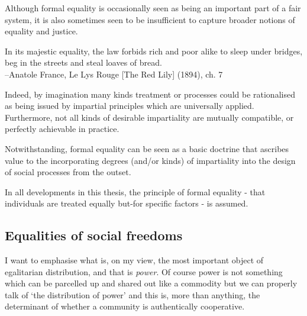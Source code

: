 Although formal equality is occasionally seen as being an important part of a fair system, it is also sometimes seen to be insufficient to capture broader notions of equality and justice.

\begin{displayquote}
In its majestic equality, the law forbids rich and poor alike to sleep under bridges, beg in the streets and steal loaves of bread.\\
--Anatole France, Le Lys Rouge [The Red Lily] (1894), ch. 7
\end{displayquote}

Indeed, by imagination many kinds treatment or processes could be rationalised as being issued by impartial principles which are universally applied. Furthermore, not all kinds of desirable impartiality are mutually compatible, or perfectly achievable in practice.\cite{Hutchinson_2019}

Notwithstanding, formal equality can be seen as a basic doctrine that ascribes value to the incorporating degrees (and/or kinds) of impartiality into the design of social processes from the outset.%

In all developments in this thesis, the principle of formal equality - that individuals are treated equally but-for specific factors - is assumed.

\subsection{Equalities of social freedoms}

\begin{displayquote}
I want to emphasise what is, on my view, the most important object of egalitarian distribution, and that is \textit{power}. Of course power is not something which can be parcelled up and shared out like a commodity but we can properly talk of `the distribution of power' and this is, more than anything, the determinant of whether a community is authentically cooperative.\cite{TheSocialBasisofEquality:1998}
\end{displayquote}

